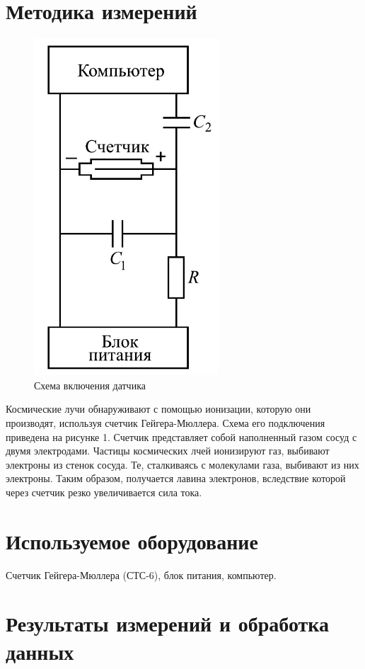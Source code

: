 \documentclass[a4paper, 12pt]{article}
\begin{document}
 	\section{Методика измерений}
	\begin{figure}[H]
		\centering
		\includegraphics[scale = 0.5]{pictures/scheme.png}
		\caption{Схема включения датчика}
	\end{figure}

	Космические лучи обнаруживают с помощью ионизации, которую они производят, используя счетчик Гейгера-Мюллера. Схема его подключения приведена на рисунке 1. Счетчик представляет собой наполненный газом сосуд с двумя электродами. Частицы космических лчей ионизируют газ, выбивают электроны из стенок сосуда. Те, сталкиваясь с молекулами газа, выбивают из них электроны. Таким образом, получается лавина электронов, вследствие которой через счетчик резко увеличивается сила тока.

	\section{Используемое оборудование}
	Счетчик Гейгера-Мюллера (СТС-6), блок питания, компьютер.

	\section{Результаты измерений и обработка данных}
\end{document}
